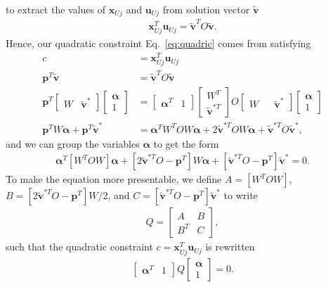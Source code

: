 \documentclass[%
preprint,
 amsmath,amssymb,
 aps,
]{revtex4-1}
\begin{document}
to extract the values of $\bm{x}_{Uj}$ and $\bm{u}_{Uj}$ from solution vector $\bm{\tilde{v}}$
\begin{align*}
\bm{x}_{Uj}^T \bm{u}_{Uj} = \bm{\tilde{v}}^T O \bm{\tilde{v}}.
\end{align*}
Hence, our quadratic constraint Eq.~\ref{eq:quadric} comes from satisfying
\begin{align*}
c &= \bm{x}^T_{Uj} \bm{u}_{Uj}\\
\bm{p}^T \bm{\tilde{v}} &= \bm{\tilde{v}}^T O \bm{\tilde{v}}\\
\bm{p}^T
\begin{bmatrix}
W & \bm{\tilde{v}}^*
\end{bmatrix} 
\begin{bmatrix}
\bm{\alpha}\\
1
\end{bmatrix}
&= 
\begin{bmatrix}
\bm{\alpha}^T & 1
\end{bmatrix} 
\begin{bmatrix}
W^T\\
\bm{\tilde{v}}^{*T}
\end{bmatrix}
O
\begin{bmatrix}
W & & \bm{\tilde{v}}^*
\end{bmatrix} 
\begin{bmatrix}
\bm{\alpha}\\
1
\end{bmatrix}\\
\bm{p}^T W \bm{\alpha} + \bm{p}^T \bm{\tilde{v}}^*
&=
\bm{\alpha}^T W^T O W \bm{\alpha} + 2\bm{\tilde{v}}^{*T}OW\bm{\alpha} + \bm{\tilde{v}}^{*T}O\bm{\tilde{v}}^*,
\end{align*}
and we can group the variables $\bm{\alpha}$ to get the form
\begin{align*}
\bm{\alpha}^T [W^TOW] \bm{\alpha} + [2\bm{\tilde{v}}^{*T}O - \bm{p}^T]W\bm{\alpha} + [\bm{\tilde{v}}^{*T}O - \bm{p}^T]\bm{\tilde{v}}^* = 0.
\end{align*}
To make the equation more presentable, we define $A = [W^TOW]$, $B = [2\bm{\tilde{v}}^{*T}O - \bm{p}^T]W/2$, and $C = [\bm{\tilde{v}}^{*T}O - \bm{p}^T]\bm{\tilde{v}}^*$ to write
\begin{align*}
Q = 
\begin{bmatrix}
A & B\\
B^T & C
\end{bmatrix},
\end{align*}
such that the quadratic constraint $c = \bm{x}_{Uj}^T\bm{u}_{Uj}$ is rewritten
\begin{align*}
\begin{bmatrix}
\bm{\alpha}^T & 1
\end{bmatrix}
Q
\begin{bmatrix}
\bm{\alpha}\\
1
\end{bmatrix}
=
0.
\end{align*}
\end{document}
